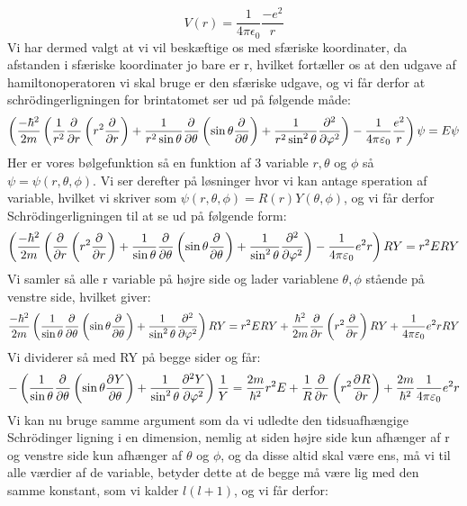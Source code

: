 \documentclass[../../Atom-ogMolekylefysik.tex]{subfiles}
\begin{document}
\begin{equation*}
    V(r)=\frac{1}{4\pi\epsilon_{0}}\frac{-e^2}{r}
\end{equation*}
Vi har dermed valgt at vi vil beskæftige os med sfæriske koordinater, da afstanden i sfæriske koordinater jo bare er r, hvilket fortæller os at den udgave af hamiltonoperatoren vi skal bruge er den sfæriske udgave, og vi får derfor at schrödingerligningen for brintatomet ser ud på følgende måde:
\begin{equation}
    \left(\frac{-\hbar^2}{2m}\left(\frac{1}{r^2}\pdif{r}{}\left(r^2\pdif{r}{}\right)+\frac{1}{r^2\sin\theta}\pdif{\theta}{}\left(\sin \theta\pdif{\theta}{}\right)+\frac{1}{r^2\sin^2\theta}\pdif[2]{\phi}{}\right)-\frac{1}{4\pi\epsilon_{0}}\frac{e^2}{r}\right)\psi=E\psi
\end{equation}
Her er vores bølgefunktion så en funktion af 3 variable $r,\theta$ og $\phi$ så $\psi=\psi(r,\theta,\phi)$. Vi ser derefter på løsninger hvor vi kan antage speration af variable, hvilket vi skriver som $\psi(r,\theta,\phi)=R(r)Y(\theta,\phi)$, og vi får derfor Schrödingerligningen til at se ud på følgende form:
\begin{equation}
    \left(\frac{-\hbar^2}{2m}\left(\pdif{r}{}\left(r^2\pdif{r}{}\right)+\frac{1}{\sin\theta}\pdif{\theta}{}\left(\sin \theta\pdif{\theta}{}\right)+\frac{1}{\sin^2\theta}\pdif[2]{\phi}{}\right)-\frac{1}{4\pi\epsilon_{0}}e^2r\right)RY=r^{2}ERY
\end{equation}
Vi samler så alle r variable på højre side og lader variablene $\theta,\phi$ stående på venstre side, hvilket giver:
\begin{equation}
    \frac{-\hbar^2}{2m}\left(\frac{1}{\sin\theta}\pdif{\theta}{}\left(\sin \theta\pdif{\theta}{}\right)+\frac{1}{\sin^2\theta}\pdif[2]{\phi}{}\right)RY=r^{2}ERY+\frac{\hbar^2}{2m}\pdif{r}{}\left(r^2\pdif{r}{}\right)RY+\frac{1}{4\pi\epsilon_{0}}e^2rRY
\end{equation}
Vi dividerer så med RY på begge sider og får:
\begin{equation}
    -\left(\frac{1}{\sin\theta}\pdif{\theta}{}\left(\sin \theta\pdif{\theta}{Y}\right)+\frac{1}{\sin^2\theta}\pdif[2]{\phi}{Y}\right)\frac{1}{Y}=\frac{2m}{\hbar^2}r^{2}E+\frac{1}{R}\pdif{r}{}\left(r^2\pdif{r}{R}\right)+\frac{2m}{\hbar^2}\frac{1}{4\pi\epsilon_{0}}e^2r
\end{equation}
Vi kan nu bruge samme argument som da vi udledte den tidsuafhængige Schrödinger ligning i en dimension, nemlig at siden højre side kun afhænger af r og venstre side kun afhænger af $\theta$ og $\phi$, og da disse altid skal være ens, må vi til alle værdier af de variable, betyder dette at de begge må være lig med den samme konstant, som vi kalder $l(l+1)$, og vi får derfor:
\end{document}
